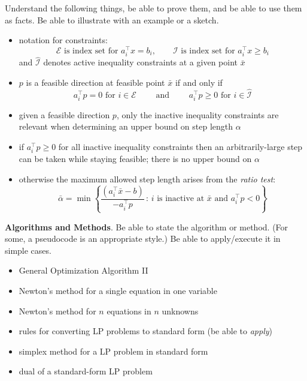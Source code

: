 \documentclass[12pt]{amsart}
\newcommand{\bigspacing}{\renewcommand{\baselinestretch}{1.13}\tiny\normalsize}
\begin{document}
Understand the following things, be able to prove them, and be able to use them as facts.  Be able to illustrate with an example or a sketch.
\begin{itemize}
\item notation for constraints:
   $$\mathcal{E} \text{ is index set for } a_i^\top x = b_i, \qquad \mathcal{I} \text{ is index set for } a_i^\top x \ge b_i$$
and $\hat{\mathcal{I}}$ denotes active inequality constraints at a given point $\bar x$
\item $p$ is a feasible direction at feasible point $\bar x$ if and only if 
        $$a_i^\top p = 0 \text{ for } i\in \mathcal{E} \qquad \text{ and } \qquad  a_i^\top p \ge 0 \text{ for }i \in \hat{\mathcal{I}}$$
\item given a feasible direction $p$, only the inactive inequality constraints are relevant when determining an upper bound on step length $\alpha$ 
\item if $a_i^\top p \ge 0$ for all inactive inequality constraints then an arbitrarily-large step can be taken while staying feasible; there is no upper bound on $\alpha$ 
\item otherwise the maximum allowed step length arises from the \emph{ratio test}: 
        $$\bar \alpha = \min \left\{\frac{(a_i^\top \bar x - b)}{-a_i^\top p} \,:\, i \text{ is inactive at $\bar x$ and } a_i^\top p < 0\right\}$$
\end{itemize}

\vfill

\newpage
\bigspacing
\noindent \textbf{Algorithms and Methods}.  Be able to state the algorithm or method.  (For some, a pseudocode is an appropriate style.)  Be able to apply/execute it in simple cases.
\begin{itemize}
\item General Optimization Algorithm II 
\item Newton's method for a single equation in one variable 
\item Newton's method for $n$ equations in $n$ unknowns 
\item rules for converting LP problems to standard form (be able to \emph{apply}) 
\item simplex method for a LP problem in standard form 
\item dual of a standard-form LP problem 
\end{itemize}

\vfill
\end{document}

